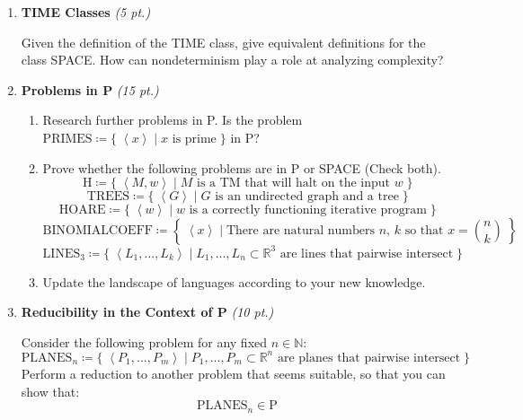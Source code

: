 \documentclass[10pt,fleqn]{article}
\theoremstyle{definition}
\theoremstyle{remark}
\newcommand{\pclass}{\text{P}}
\newcommand{\lpp}{\left \langle}
\newcommand{\rpp}{\right \rangle}
\newcommand{\enc}[1]{\lpp #1 \rpp}
\begin{document}
\begin{enumerate}

    \item{\textbf{TIME Classes} \hfill \emph{(5 pt.)}}
    
    Given the definition of the TIME class, give equivalent definitions for the class SPACE. How can nondeterminism play a role at analyzing complexity?

    \item{\textbf{Problems in P} \hfill \emph{(15 pt.)}}
    
    \begin{enumerate}
        \item Research further problems in P. Is the problem
        \(
            \text{PRIMES} \coloneqq \{ \; \enc{x} \mid x \text{ is prime} \; \}
        \)
        in P?
        \item Prove whether the following problems are in P or SPACE (Check both).
        \[
            \text{H} \coloneqq \{\;\enc{M, w} \mid M \text{ is a TM that will halt on the input } w\;\}
        \]
        \[
            \text{TREES} \coloneqq \{\; \enc{G} \mid G \text{ is an undirected graph and a tree} \;\}
        \]
        \[
            \text{HOARE} \coloneqq \{\; \enc{w} \mid w \text{ is a correctly functioning iterative program} \;\}
        \]
        \[
            \text{BINOMIALCOEFF} \coloneqq \left\{ \; \enc{x} \mid \text{There are natural numbers } n \text{, } k \text{ so that } x = \binom{n}{k} \; \right\}
        \]
        \[
            \text{LINES}_3 \coloneqq \{\; \enc{L_1, ..., L_k} \mid L_1, ..., L_n \subset \mathbb{R}^3 \text{ are lines that pairwise intersect} \;\}
        \]
        \item Update the landscape of languages according to your new knowledge.
    \end{enumerate}

    \item{\textbf{Reducibility in the Context of P} \hfill \emph{(10 pt.)}}
    
    Consider the following problem for any fixed \(n \in \mathbb{N}\):
    \[
        \text{PLANES}_n \coloneqq \{\; \enc{P_1, ..., P_m} \mid P_1, ..., P_m \subset \mathbb{R}^n \text{ are planes that pairwise intersect} \;\}
    \]
    Perform a reduction to another problem that seems suitable, so that you can show that:
    \[
        \text{PLANES}_n \in \pclass
    \]

\end{enumerate}
\end{document}
